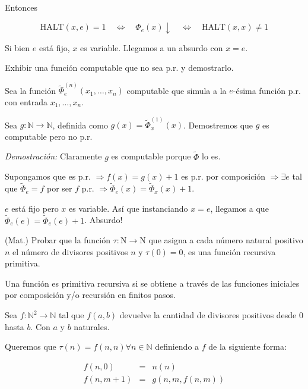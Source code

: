 \begin{questions}
\begin{solution}
Entonces

$$
\text{HALT}(x,e)=1 \quad\Leftrightarrow\quad \Phi_e(x)\downarrow \quad\Leftrightarrow\quad \text{HALT}(x,x)\neq 1
$$

Si bien $e$ est\'a fijo, $x$ es variable. Llegamos a un absurdo con $x=e$. 
\end{solution}

\question Exhibir una función computable que no sea p.r. y demostrarlo.

\begin{solution}

Sea la funci\'on $\tilde{\Phi}_e^{(n)}(x_1,\dots,x_n)$ computable que simula a la $e$-\'esima funci\'on p.r. con entrada $x_1, \dots, x_n$.

Sea $g : \mathbb{N} \rightarrow \mathbb{N}$, definida como $g(x) = \tilde{\Phi}_x^{(1)}(x)$. Demostremos que $g$ es computable pero no p.r.

{\it Demostraci\'on: } Claramente $g$ es computable porque $\tilde{\Phi}$ lo es. 

Supongamos que es p.r. $\Rightarrow f(x) = g(x)+1$ es p.r. por composici\'on $\Rightarrow \exists e$ tal que $\tilde{\Phi}_e = f$ por ser $f$ p.r. $\Rightarrow\tilde{\Phi}_e(x) = \tilde{\Phi}_x(x)+1$.

$e$ est\'a fijo pero $x$ es variable. As\'i que instanciando $x=e$, llegamos a que $\tilde{\Phi}_e(e) = \tilde{\Phi}_e(e)+1$. Absurdo!

\end{solution}

\question (Mat.) Probar que la funci\'on $\tau : \mathrm{N} \rightarrow \mathrm{N}$ que asigna a cada n\'umero natural positivo $n$ el n\'umero de divisores positivos $n$ y $\tau(0)=0$, es una funci\'on recursiva primitiva. 

\begin{solution}

Una función es primitiva recursiva si se obtiene a través de las funciones iniciales por composición y/o recursión en finitos pasos.

Sea $f:\mathbb{N}^2 \to \mathbb{N}$ tal que $f(a,b)$ devuelve la cantidad de divisores positivos desde $0$ hasta $b$. Con $a$ y $b$ naturales.

Queremos que $\tau(n) = f(n,n) \forall n \in \mathbb{N}$ definiendo a $f$ de la siguiente forma:

\begin{eqnarray*}
f(n,0)&=&n(n) \\
f(n,m+1)&=&g(n,m,f(n,m))
\end{eqnarray*}


\end{solution}
\end{questions}
